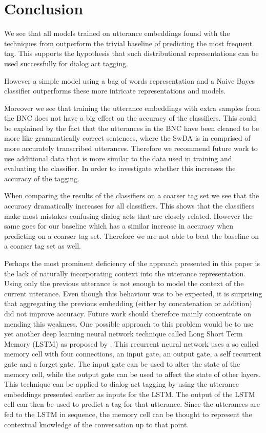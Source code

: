 \section{Conclusion}\label{sec:conclusion}
We see that all models trained on utterance embeddings found with the techniques from  outperform the trivial baseline of predicting the most frequent tag. This supports the hypothesis that such distributional representations can be used successfully for dialog act tagging.

However a simple model using a bag of words representation and a Naive Bayes classifier outperforms these more intricate representations and models. 

Moreover we see that training the utterance embeddings with extra samples from the BNC does not have a big effect on the accuracy of the classifiers. This could be explained by the fact that the utterances in the BNC have been cleaned to be more like grammatically correct sentences, where the SwDA is in comprised of more accurately transcribed utterances. Therefore we recommend future work to use additional data that is more similar to the data used in training and evaluating the classifier. In order to investigate whether this increases the accuracy of the tagging.

When comparing the results of the classifiers on a coarser tag set we see that the accuracy dramatically increases for all classifiers. This shows that the classifiers make most mistakes confusing dialog acts that are closely related. However the same goes for our baseline which has a similar increase in accuracy when predicting on a coarser tag set. Therefore we are not able to beat the baseline on a coarser tag set as well.

Perhaps the most prominent deficiency of the approach presented in this paper is the lack of naturally incorporating context into the utterance representation. Using only the previous utterance is not enough to model the context of the current utterance. Even though this behaviour was to be expected, it is surprising that aggregating the previous embedding (either by concatenation or addition) did not improve accuracy. Future work should therefore mainly concentrate on mending this weakness. One possible approach to this problem would be to use yet another deep learning neural network technique called Long Short Term Memory (LSTM) as proposed by . This recurrent neural network uses a so called memory cell with four connections, an input gate, an output gate, a self recurrent gate and a forget gate. The input gate can be used to alter the state of the memory cell, while the output gate can be used to affect the state of other layers. This technique can be applied to dialog act tagging by using the utterance embeddings presented earlier as inputs for the LSTM. The output of the LSTM cell can then be used to predict a tag for that utterance. Since the utterances are fed to the LSTM in sequence, the memory cell can be thought to represent the contextual knowledge of the conversation up to that point.

